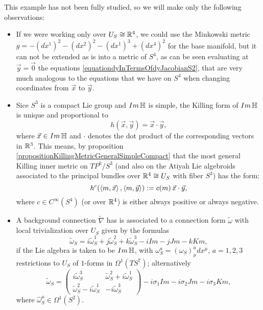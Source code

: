 This example has not been fully studied, so we will make only the following observations:
\begin{itemize}
    \item If we were working only over $U_S \cong \mathbb{R}^4$, we could use the Minkowski metric $g = -(dx^1)^2 -(dx^2)^2-(dx^1)^3+(dx^4)^2$ for the base manifold, but it can not be extended as is into a metric of $S^4$, as can be seen evaluating at $\vec y = \vec 0$ the equations \eqref{equationdyInTermsOfdyJacobianS2}, that are very much analogous to the equations that we have on $S^4$ when changing coordinates from $\vec x$ to $\vec y$.
    
    \item Sice $S^3$ is a compact Lie group and $Im\operatorname{\mathbb{H}}$ is simple, the Killing form of $Im\operatorname{\mathbb{H}}$ is unique and proportional to 
    \begin{equation*}
        h(\vec x, \vec y) = \vec x \cdot \vec y,
    \end{equation*} where $\vec x \in Im \operatorname{\mathbb{H}}$ and $\cdot$ denotes the dot product of the corresponding vectors in $\mathbb{R}^3$. This means, by proposition \ref{propositionKillingMetricGeneralSimpleCompact} that the most general Killing inner metric on $TP^k/S^3$ (and also on the Atiyah Lie algebroids associated to the principal bundles over $\mathbb{R}^4 \cong U_S$ with fiber $S^3$) has the form:
    \begin{equation}\label{equationKIllingMetricTPkS2}
        h^c(\left\langle m, \vec x \right\rangle, \left\langle m, \vec y \right\rangle) := c(m)\,\vec x \cdot \vec y,
    \end{equation}
    where $c \in C^\infty(S^4)$ (or over $\mathbb{R}^4$) is either always positive or always negative.
    
    \item A background connection $\tilde \nabla$ has is associated to a connection form $\tilde \omega$ with local trivialization over $U_S$ given by the formulas
        \begin{equation}
        \tilde \omega_S = i \tilde \omega_S^1 + j \tilde \omega_S^2 + k \tilde \omega_S^3 - iIm - jJm - kKm,
        \end{equation}
    if the Lie algebra is taken to be $Im\operatorname{\mathbb{H}}$, with $\omega_S^a = (\omega_S)^a_\mu dx^\mu$, $a = 1, 2, 3$ restrictions to $U_S$ of $1$-forms in $\Omega^1(TS^7)$; alternatively 
        \begin{equation}
         \tilde \omega_S =   \begin{pmatrix} i\tilde \omega_S^3 & \tilde \omega_S^2 + i \tilde \omega_S^1 \\ \tilde \omega_S^2 - i \tilde \omega_S^1 & -i\tilde \omega_S^3  \end{pmatrix} - i \sigma_1 Im - i \sigma_2 Jm - i \sigma_3 Km,
        \end{equation}
        where $\hat \omega_S^\mu \in \Omega^1(S^2)$.
        
\end{itemize}